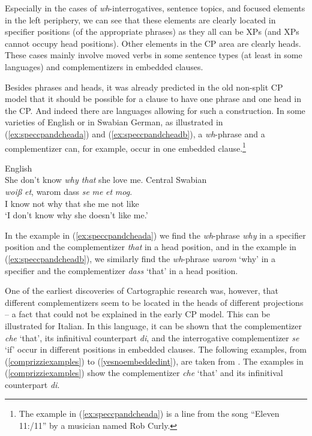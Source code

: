 Especially in the cases of \textit{wh}-interrogatives, sentence topics, and focused elements in the left periphery, we can see that these elements are clearly located in specifier positions (of the appropriate phrases) as they all can be XPs (and XPs cannot occupy head positions). Other elements in the CP area are clearly heads. These cases mainly involve moved verbs in some sentence types (at least in some languages) and complementizers in embedded clauses.

Besides phrases and heads, it was already predicted in the old non-split CP model that it should be possible for a clause to have one phrase and one head in the CP. And indeed there are languages allowing for such a construction. In some varieties of English or in Swabian German, as illustrated in (\ref{ex:speccpandcheada}) and (\ref{ex:speccpandcheadb}), a \textit{wh}-phrase and a complementizer can, for example, occur in one embedded clause.\footnote{ The example in (\ref{ex:speccpandcheada}) is a line from the song ``Eleven 11:/11'' by a musician named Rob Curly.}

\begin{exe}
\ex\begin{xlist} 
\ex English \\ She don't know \textit{why that} she love me. \label{ex:speccpandcheada}
\ex Central Swabian \\  {\textit{woi\ss }}  {\textit{et},} {warom} {dass} {\textit{se}} {\textit{me}} {\textit{et}} {\textit{mog}.} \\
{I} {know} {not} {why} {that} {she} {me} {not} {like} \\
\trans `I don't know why she doesn't like me.' \label{ex:speccpandcheadb}
\end{xlist}
\end{exe}

\noindent In the example in (\ref{ex:speccpandcheada}) we find the \textit{wh}-phrase \textit{why} in a specifier position and the complementizer \textit{that} in a head position, and in the example in (\ref{ex:speccpandcheadb}), we similarly find the \textit{wh}-phrase \textit{warom} `why' in a specifier and the complementizer \textit{dass} `that' in a head position. 

One of the earliest discoveries of Cartographic research was, however, that different complementizers seem to be located in the heads of different projections \citep{rizzi1997fine} -- a fact that could not be explained in the early CP model. This can be illustrated for Italian. In this language, it can be shown that the complementizer \textit{che} `that', its infinitival counterpart \textit{di}, and the interrogative complementizer \textit{se} `if' occur in different positions in embedded clauses. The following examples, from (\ref{comprizziexamples}) to (\ref{yesnoembeddedint}), are taken from \citet[205]{rizzi2013notes}. The examples in (\ref{comprizziexamples}) show the complementizer \textit{che} `that' and its infinitival counterpart \textit{di}.

